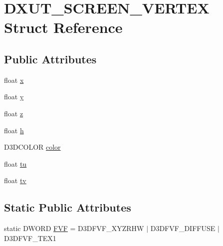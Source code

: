 \hypertarget{struct_d_x_u_t___s_c_r_e_e_n___v_e_r_t_e_x}{
\section{DXUT\_\-SCREEN\_\-VERTEX Struct Reference}
\label{struct_d_x_u_t___s_c_r_e_e_n___v_e_r_t_e_x}
}
\subsection*{Public Attributes}
\begin{DoxyCompactItemize}
\item 
float \hyperlink{struct_d_x_u_t___s_c_r_e_e_n___v_e_r_t_e_x_a86437d26d068a9faeb2802b35b55940d}{x}
\item 
float \hyperlink{struct_d_x_u_t___s_c_r_e_e_n___v_e_r_t_e_x_a6a731737070bef7655f01dbed96fda89}{y}
\item 
float \hyperlink{struct_d_x_u_t___s_c_r_e_e_n___v_e_r_t_e_x_ac036ee8f17d574b27aa47b2e9327ee00}{z}
\item 
float \hyperlink{struct_d_x_u_t___s_c_r_e_e_n___v_e_r_t_e_x_a07f8215a46cdcfb9cd7a6e5d205dd794}{h}
\item 
D3DCOLOR \hyperlink{struct_d_x_u_t___s_c_r_e_e_n___v_e_r_t_e_x_a4a1e6ac32a7e752e8ce6f60cad1469f6}{color}
\item 
float \hyperlink{struct_d_x_u_t___s_c_r_e_e_n___v_e_r_t_e_x_a3598a58452fda2c5ae7fac091c3ef64e}{tu}
\item 
float \hyperlink{struct_d_x_u_t___s_c_r_e_e_n___v_e_r_t_e_x_adfeea1725a0f11599eab7544a2ee1649}{tv}
\end{DoxyCompactItemize}
\subsection*{Static Public Attributes}
\begin{DoxyCompactItemize}
\item 
static DWORD \hyperlink{struct_d_x_u_t___s_c_r_e_e_n___v_e_r_t_e_x_a780008d5b7035a09a3422e0407c701a7}{FVF} = D3DFVF\_\-XYZRHW $|$ D3DFVF\_\-DIFFUSE $|$ D3DFVF\_\-TEX1
\end{DoxyCompactItemize}


